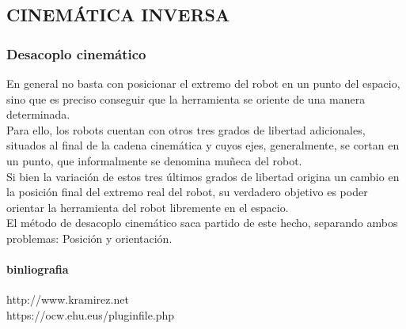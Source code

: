 \documentclass[12pt,a4paper]{article}
\begin{document}
\subsection{CINEMÁTICA INVERSA}
\subsubsection{Desacoplo cinemático}
En general no basta con posicionar el extremo del robot en un punto del espacio, sino que es preciso conseguir que la herramienta se oriente de una manera determinada.\\
Para ello, los robots cuentan con otros tres grados de libertad adicionales, situados al final de la cadena cinemática y cuyos ejes, generalmente, se cortan en un punto, que informalmente se denomina muñeca del robot.\\
Si bien la variación de estos tres últimos grados de libertad origina un cambio en la posición final del extremo real del robot, su verdadero objetivo es poder orientar la herramienta del robot libremente en el espacio.\\
El método de desacoplo cinemático saca partido de este hecho, separando ambos problemas: Posición y orientación.\\



\paragraph{binliografia}
http://www.kramirez.net \\
https://ocw.ehu.eus/pluginfile.php \\
\end{document}
